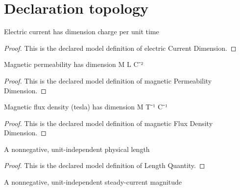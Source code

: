 \section{Declaration topology}
\begin{definition}
  \label{def:physics:phyx-mini-0966:phyxminiproblems-problemphyxmini0966-electriccurrentdimension}
  Electric current has dimension charge per unit time
\end{definition}
\begin{proof}
  This is the declared model definition of electric Current Dimension.
\end{proof}
\begin{definition}
  \label{def:physics:phyx-mini-0966:phyxminiproblems-problemphyxmini0966-magneticpermeabilitydimension}
  Magnetic permeability has dimension M L C⁻²
\end{definition}
\begin{proof}
  This is the declared model definition of magnetic Permeability Dimension.
\end{proof}
\begin{definition}
  \label{def:physics:phyx-mini-0966:phyxminiproblems-problemphyxmini0966-magneticfluxdensitydimension}
  Magnetic flux density (tesla) has dimension M T⁻¹ C⁻¹
\end{definition}
\begin{proof}
  This is the declared model definition of magnetic Flux Density Dimension.
\end{proof}
\begin{definition}
  \label{def:physics:phyx-mini-0966:phyxminiproblems-problemphyxmini0966-lengthquantity}
  A nonnegative, unit-independent physical length
\end{definition}
\begin{proof}
  This is the declared model definition of Length Quantity.
\end{proof}
\begin{definition}
  \label{def:physics:phyx-mini-0966:phyxminiproblems-problemphyxmini0966-electriccurrentquantity}
  A nonnegative, unit-independent steady-current magnitude
\end{definition}
